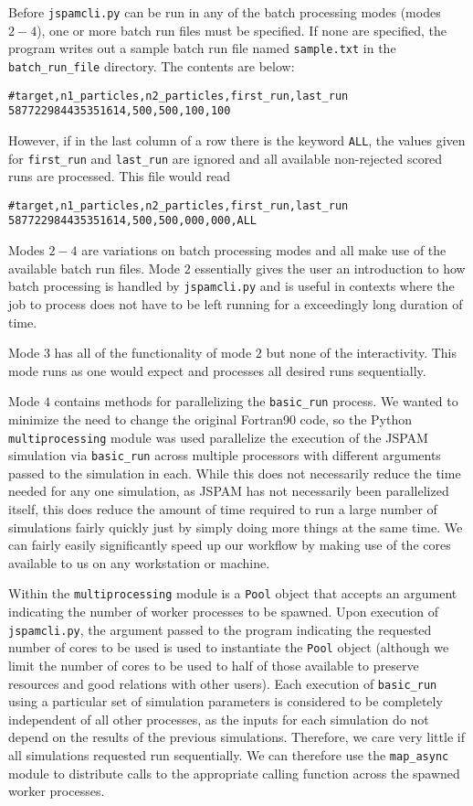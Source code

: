 Before \texttt{jspamcli.py} can be run in any of the batch processing modes
(modes $2-4$), one or more batch run files must be specified. If none are
specified, the program writes out a sample batch run file named
\texttt{sample.txt} in the \texttt{batch\_run\_file} directory.
The contents are below:
\begin{verbatim}
#target,n1_particles,n2_particles,first_run,last_run
587722984435351614,500,500,100,100
\end{verbatim}
However, if in the last column of a row there is the keyword \texttt{ALL}, the
values given for \texttt{first\_run} and \texttt{last\_run} are ignored
and all available non-rejected scored runs are processed. This file would read
\begin{verbatim}
#target,n1_particles,n2_particles,first_run,last_run
587722984435351614,500,500,000,000,ALL
\end{verbatim}

Modes $2-4$ are variations on batch processing modes and all make
use of the available batch run files.
Mode $2$ essentially gives the user an
introduction to how batch processing is handled by \texttt{jspamcli.py} and is
useful in contexts where the job to process does not have to be left running
for a exceedingly long duration of time.

Mode $3$ has all of the functionality of mode $2$ but none of the interactivity.
This mode runs as one would expect and processes all desired runs sequentially.

Mode $4$ contains methods for parallelizing the \texttt{basic\_run} process.
We wanted to minimize the need to change the original Fortran90 code, so the
Python \texttt{multiprocessing} module was used parallelize the execution of
the JSPAM simulation via \texttt{basic\_run} across multiple processors with
different arguments passed to the simulation in each.
While this does not necessarily reduce the time needed for any one simulation,
as JSPAM has not necessarily been parallelized itself,
this does reduce the amount of time
required to run a large number of simulations fairly quickly just by simply
doing more things at the same time. We can fairly easily significantly
speed up our workflow by making use of the cores available to us on any
workstation or machine.

Within the \texttt{multiprocessing} module is a \texttt{Pool} object that
accepts an argument indicating the number of worker processes to be spawned.
Upon execution of \texttt{jspamcli.py}, the argument passed to the program
indicating the requested number of cores to be used is used to instantiate the
\texttt{Pool} object (although we limit the number of cores to be used to half
of those available to preserve resources and good relations with other users).
Each execution of \texttt{basic\_run} using a
particular set of simulation parameters is considered to be completely
independent of all other processes, as the inputs for each simulation do not
depend on the results of the previous simulations. Therefore, we care very
little if all simulations requested run sequentially. We can therefore use the
\texttt{map\_async} module to distribute calls to the appropriate calling
function across the spawned worker processes.

